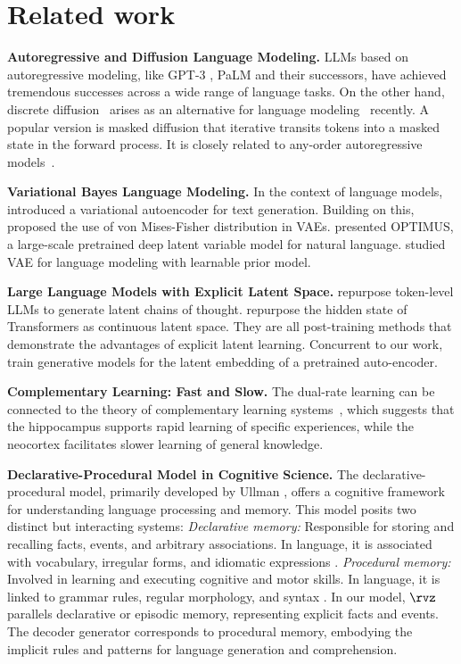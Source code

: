 \section{Related work}
{\bf Autoregressive and Diffusion Language Modeling.} LLMs based on autoregressive modeling, like GPT-3 \citep{brown2020language}, PaLM \citep{chowdhery2022palm} and their successors, have achieved tremendous successes across a wide range of language tasks. On the other hand, discrete diffusion~\citep{austin2021structured} arises as an alternative for language modeling~\citep{lou2024discrete,shi2024simplified,sahoo2024simple} recently. A popular version is masked diffusion that iterative transits tokens into a masked state in the forward process. It is closely related to any-order autoregressive models~\citep{uria2014deep, hoogeboomautoregressive}.

{\bf Variational Bayes Language Modeling.}
In the context of language models, \citet{bowman2016generating} introduced a variational autoencoder for text generation. 
Building on this, \citet{xu2018spherical} proposed the use of von Mises-Fisher distribution in VAEs. \citet{li2020optimus} presented OPTIMUS, a large-scale pretrained deep latent variable model for natural language. \citet{pang2021latent,yu2022latent} studied VAE for language modeling with learnable prior model. 

{\bf Large Language Models with Explicit Latent Space.} \citet{zelikman2022star,hu2023amortizing,hoffman2024training} repurpose token-level LLMs to generate latent chains of thought. \citet{hao2024training} repurpose the hidden state of Transformers as continuous latent space. They are all post-training methods that demonstrate the advantages of explicit latent learning. Concurrent to our work, \citet{the2024large} train generative models for the latent embedding of a pretrained auto-encoder. 

{\bf Complementary Learning: Fast and Slow.} The dual-rate learning can be connected to the theory of complementary learning systems~\citep{mcclelland1995there}, which suggests that the hippocampus supports rapid learning of specific experiences, while the neocortex facilitates slower learning of general knowledge.

{\bf Declarative-Procedural Model in Cognitive Science.} The declarative-procedural model, primarily developed by Ullman \cite{ullman2004contributions}, offers a cognitive framework for understanding language processing and memory. This model posits two distinct but interacting systems: \textit{Declarative memory:} Responsible for storing and recalling facts, events, and arbitrary associations. In language, it is associated with vocabulary, irregular forms, and idiomatic expressions \cite{ullman2001neural}. \textit{Procedural memory:} Involved in learning and executing cognitive and motor skills. In language, it is linked to grammar rules, regular morphology, and syntax \cite{ullman2004contributions}. In our model, $\rvz$ parallels  declarative or episodic memory, representing explicit facts and events. The decoder generator corresponds to procedural memory, embodying the implicit rules and patterns for language generation and comprehension.


